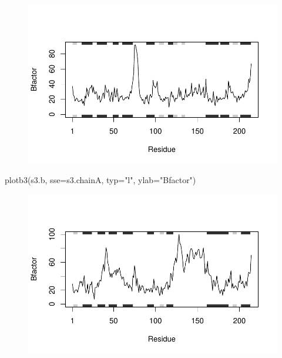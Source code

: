 \documentclass[
  letterpaper,
  DIV=11,
  numbers=noendperiod]{scrartcl}
\newenvironment{Shaded}{\begin{snugshade}}{\end{snugshade}}
\newcommand{\AttributeTok}[1]{\textcolor[rgb]{0.40,0.45,0.13}{#1}}
\newcommand{\FunctionTok}[1]{\textcolor[rgb]{0.28,0.35,0.67}{#1}}
\newcommand{\NormalTok}[1]{\textcolor[rgb]{0.00,0.23,0.31}{#1}}
\newcommand{\StringTok}[1]{\textcolor[rgb]{0.13,0.47,0.30}{#1}}
\begin{document}
\begin{figure}[H]

{\centering \includegraphics{hw6_turnin_files/figure-pdf/unnamed-chunk-5-2.pdf}

}

\end{figure}

\begin{Shaded}
\begin{Highlighting}[]
\FunctionTok{plotb3}\NormalTok{(s3.b, }\AttributeTok{sse=}\NormalTok{s3.chainA, }\AttributeTok{typ=}\StringTok{"l"}\NormalTok{, }\AttributeTok{ylab=}\StringTok{"Bfactor"}\NormalTok{)}
\end{Highlighting}
\end{Shaded}

\begin{figure}[H]

{\centering \includegraphics{hw6_turnin_files/figure-pdf/unnamed-chunk-5-3.pdf}

}

\end{figure}
\end{document}

